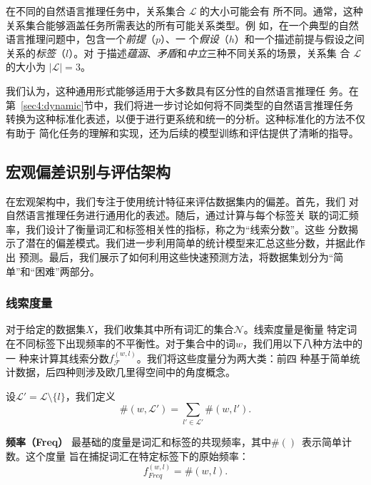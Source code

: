 在不同的自然语言推理任务中，关系集合 $\mathcal{L}$ 的大小可能会有
所不同。通常，这种关系集合能够涵盖任务所需表达的所有可能关系类型。例
如，在一个典型的自然语言推理问题中，包含一个\textit{前提}（$p$）、一
个\textit{假设}（$h$）和一个描述前提与假设之间关系的\textit{标签}（$l$）。对
于描述\textit{蕴涵}、\textit{矛盾}和\textit{中立}三种不同关系的场景，关系集
合 $\mathcal{L}$ 的大小为 $|\mathcal{L}| = 3$。

我们认为，这种通用形式能够适用于大多数具有区分性的自然语言推理任
务。在第~\ref{sec4:dynamic}节中，我们将进一步讨论如何将不同类型的自然语言推理任务
转换为这种标准化表述，以便于进行更系统和统一的分析。这种标准化的方法不仅有助于
简化任务的理解和实现，还为后续的模型训练和评估提供了清晰的指导。

\subsection{宏观偏差识别与评估架构}
\label{sec4:approach1}
在宏观架构中，我们专注于使用统计特征来评估数据集内的偏差。首先，我们
对自然语言推理任务进行通用化的表述。随后，通过计算与每个标签关
联的词汇频率，我们设计了衡量词汇和标签相关性的指标，称之为``线索分数''。这些
分数揭示了潜在的偏差模式。我们进一步利用简单的统计模型来汇总这些分数，并据此作出
预测。最后，我们展示了如何利用这些快速预测方法，将数据集划分为``简单''和``困难''两部分。

\subsubsection{线索度量}

对于给定的数据集\(X\)，我们收集其中所有词汇的集合\(\mathcal{N}\)。线索度量是衡量
特定词在不同标签下出现频率的不平衡性。对于集合中的词\(w\)，我们用以下八种方法中的一
种来计算其线索分数\(f_{\mathcal{F}}^{(w,l)}\)。我们将这些度量分为两大类：前四
种基于简单统计数据，后四种则涉及欧几里得空间中的角度概念。

设\(\mathcal{L'} = \mathcal{L} \setminus \{l\}\)，我们定义
\begin{equation}
\#(w, \mathcal{L'}) = \sum_{l' \in \mathcal{L'}} \#(w, l').
\end{equation}

\textbf{频率（Freq）}
最基础的度量是词汇和标签的共现频率，其中\(\#()\)\ 表示简单计数。这个度量
旨在捕捉词汇在特定标签下的原始频率：
\begin{equation}
f_{Freq}^{(w,l)} = \#(w, l).
\end{equation}

